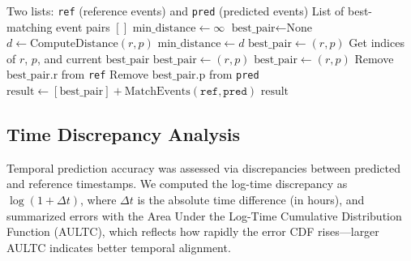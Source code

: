 \begin{algorithm}[tbp]
\caption{Recursive Best Match}
\label{alg:recursive_match}
\begin{algorithmic}[1]
\Require Two lists: \texttt{ref} (reference events) and \texttt{pred} (predicted events)
\Ensure List of best-matching event pairs
        \State \Return $[]$
    \EndIf
    \State $\text{min\_distance} \gets \infty$
    \State $\text{best\_pair} \gets \text{None}$
            \State $d \gets \text{ComputeDistance}(r, p)$
                \State $\text{min\_distance} \gets d$
                \State $\text{best\_pair} \gets (r, p)$
                \State Get indices of $r$, $p$, and current $\text{best\_pair}$
                    \State $\text{best\_pair} \gets (r, p)$
                    \State $\text{best\_pair} \gets (r, p)$
                \EndIf
            \EndIf
        \EndFor
    \EndFor
    \State Remove $\text{best\_pair.r}$ from \texttt{ref}
    \State Remove $\text{best\_pair.p}$ from \texttt{pred}
    \State $\text{result} \gets [\text{best\_pair}] + \text{MatchEvents}(\texttt{ref}, \texttt{pred})$
    \State \Return $\text{result}$
\EndFunction
\end{algorithmic}
\end{algorithm}


\subsection*{Time Discrepancy Analysis}
 Temporal prediction accuracy was assessed via discrepancies between predicted and reference timestamps. We computed the log-time discrepancy as $\log(1+\Delta t)$, where $\Delta t$ is the absolute time difference (in hours), and summarized errors with the Area Under the Log-Time Cumulative Distribution Function (AULTC), which reflects how rapidly the error CDF rises—larger AULTC indicates better temporal alignment. 

